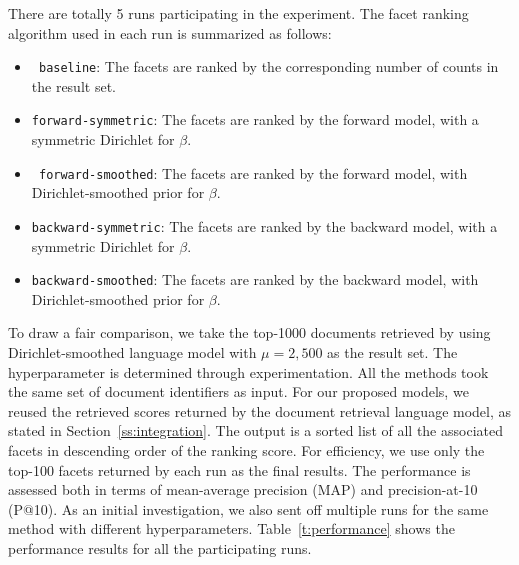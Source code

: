 
There are totally 5 runs participating in the experiment.  The facet ranking
algorithm used in each run is summarized as follows: \begin{itemize} \item {\tt
baseline}:  The facets are ranked by the corresponding number of counts in the
result set.  \item {\tt forward-symmetric}:  The facets are ranked by the
forward model, with a symmetric Dirichlet for $\beta$.  \item {\tt
forward-smoothed}:  The facets are ranked by the forward model, with
Dirichlet-smoothed prior for $\beta$.  \item {\tt backward-symmetric}:  The
facets are ranked by the backward model, with a symmetric Dirichlet for
$\beta$.  \item {\tt backward-smoothed}:  The facets are ranked by the backward
model, with Dirichlet-smoothed prior for $\beta$.  \end{itemize}

To draw a fair comparison, we take the top-1000 documents retrieved by using
Dirichlet-smoothed language model with $\mu = 2,500$ as the result set.  The
hyperparameter is determined through experimentation.  All the methods took the
same set of document identifiers as input.  For our proposed models, we reused
the retrieved scores returned by the document retrieval language model, as
stated in Section~\ref{ss:integration}.  The output is a sorted list of all the
associated facets in descending order of the ranking score.  For efficiency, we
use only the top-100 facets returned by each run as the final results.  The
performance is assessed both in terms of mean-average precision (MAP) and
precision-at-10 (P@10).  As an initial investigation, we also sent off multiple
runs for the same method with different hyperparameters.
Table~\ref{t:performance} shows the performance results for all the
participating runs.

